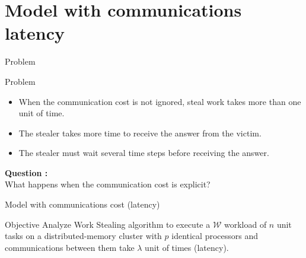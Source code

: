 \documentclass{beamer}
\begin{document}
\section{Model with communications latency}
\begin{frame}{Problem}
    \begin{alertblock}{Problem}
        \begin{itemize}
            \item When the communication cost is not ignored, steal work takes more than one unit of time. \\
            \item The stealer takes more time to receive the answer from the victim. 
            \item The stealer must wait several time steps before receiving the answer. 
        \end{itemize}
    \end{alertblock}
    \textbf{Question :}
    \\
        What happens when the communication cost is explicit?
\end{frame} 


\begin{frame}{Model with communications cost (latency)}
    \begin{alertblock}{Objective}
        Analyze \alert{Work Stealing} algorithm to execute a $\mathcal{W}$ workload of $n$ unit tasks on a distributed-memory cluster with $p$ identical processors and communications between them take \alert{$\lambda$} unit of times (latency).
    \end{alertblock}
\end{frame}
\end{document}
